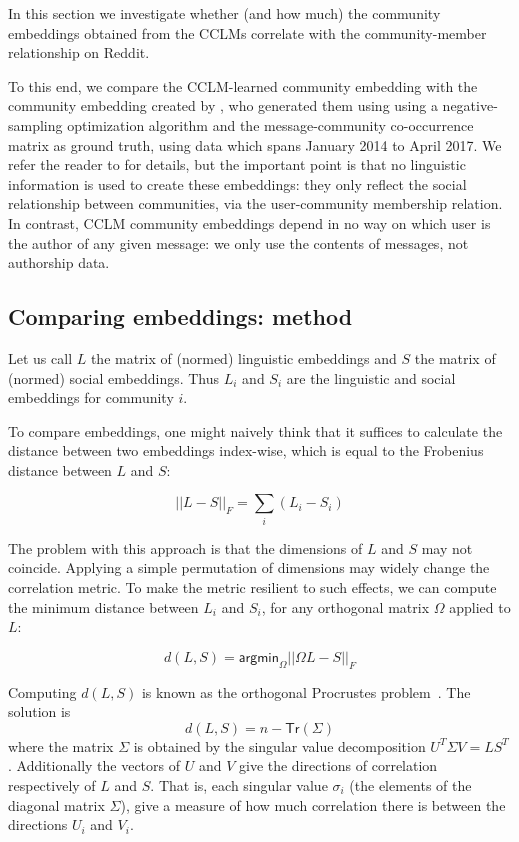 \documentclass[11pt]{article}
\begin{document}
In this section we investigate whether (and how much) the community
embeddings obtained from the CCLMs correlate with the community-member
relationship on Reddit.

To this end, we compare the CCLM-learned community
embedding with the community embedding created by \citet{Kumar2018},
who generated them using using a negative-sampling optimization
algorithm and the message-community co-occurrence matrix as ground
truth, using data which spans January 2014 to April 2017.
We refer the reader
to \citet{Kumar2018}
for details, but the important point is that no linguistic
information is used to create these embeddings: they only reflect the social
relationship between communities, via 
the user-community membership relation. In contrast, CCLM community embeddings depend in no
way on which user is the author of any given message: we only use the
contents of messages, not authorship data.
%

\subsection{Comparing embeddings: method}

Let us call \(L\) the matrix of (normed) linguistic embeddings and \(S\) the matrix
of (normed) social embeddings. Thus \(L_i\) and \(S_i\) are the linguistic and
social embeddings for community \(i\).

To compare embeddings, one might naively think that it suffices to
calculate the distance between two embeddings index-wise, which is
equal to the Frobenius distance between \(L\) and \(S\):

\[||L-S||_F = \sum_i (L_i - S_i)\]

The problem with this approach is that the dimensions of \(L\) and \(S\) may
not coincide. Applying a simple permutation of dimensions may widely
change the correlation metric. To make the metric resilient to such
effects, we can compute the minimum distance between \(L_i\) and \(S_i\), for
any orthogonal matrix \(\Omega\) applied to \(L\):

\[d(L,S) = \mathsf{argmin}_\Omega ||ΩL-S||_F\]

Computing \(d(L,S)\) is known as the orthogonal Procrustes problem~\citep{Gower2004}. The
solution is
\[d(L,S) = n - \mathsf {Tr} (Σ)\] where the matrix \(Σ\) is obtained by the singular value
decomposition \(U^TΣV = LS^T\). Additionally the vectors of \(U\) and \(V\) give
the directions of correlation respectively of \(L\) and \(S\). That is, each
singular value \(\sigma_i\) (the elements of the diagonal matrix \(Σ\)), give a measure of how much
correlation there is between the directions \(U_i\) and \(V_i\).
\end{document}
